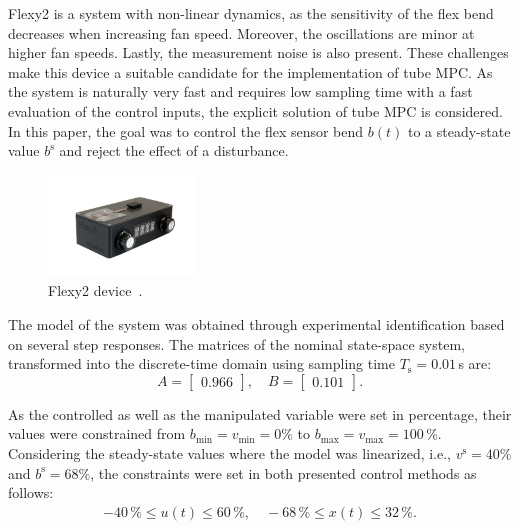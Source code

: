 \documentclass[letterpaper, 10 pt, conference]{ieeeconf}
\begin{document}
	Flexy2 is a system with non-linear dynamics, as the sensitivity of the flex bend decreases when increasing fan speed. Moreover, the oscillations are minor at higher fan speeds. Lastly, the measurement noise is also present. These challenges make this device a suitable candidate for the implementation of tube MPC. As the system is naturally very fast and requires low sampling time with a fast evaluation of the control inputs, the explicit solution of tube MPC is considered. In this paper, the goal was to control the flex sensor bend $b(t)$ to a steady-state value $b^\text{s}$ and reject the effect of a disturbance.
	
	\begin{figure}
		\begin{center}
			\includegraphics[width=0.35\textwidth]{images/flexy2}
			\caption{Flexy2 device~\cite{flexy2}.}
			\label{fig:flexy2}
		\end{center}
	\end{figure}
	
	The model of the system was obtained through experimental identification based on several step responses. The matrices of the nominal state-space system, transformed into the discrete-time domain using sampling time $T_\mathrm{s} = 0.01$\,s are:
	\begin{equation}
		\label{eq:model_A_B} 
		A = \begin{bmatrix}
			0.966
		\end{bmatrix}, \quad 
		B = \begin{bmatrix}
			0.101
		\end{bmatrix}. 
	\end{equation}
	
	As the controlled as well as the manipulated variable were set in percentage, their values were constrained from $b_{\min} = v_{\min} = 0\%$ to $b_{\max} = v_{\max} = 100\,\%$. Considering the steady-state values where the model was linearized, i.e., $ v^\mathrm{s} = 40\%$ and $ b^\mathrm{s} = 68\%$, the constraints were set in both presented control methods as follows: 
	\begin{eqnarray}
		\label{eq:const_u_y}
		-40\,\% \le u(t) \le 60\,\%, \quad -68\,\% \le x(t) \le 32\,\%.
	\end{eqnarray}
	
\end{document}
